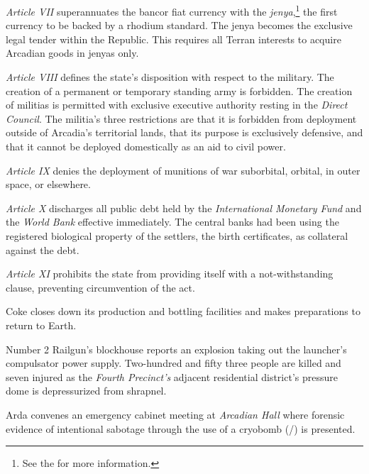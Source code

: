 \item {\it Article VII} superannuates the bancor fiat currency with the {\it jenya},\footnote{See the \about[Jenya] for more information.} the first currency to be backed by a rhodium standard. The jenya becomes the exclusive legal tender within the Republic. This requires all Terran interests to acquire Arcadian goods in jenyas only.

\item {\it Article VIII} defines the state's disposition with respect to the military. The creation of a permanent or temporary standing army is forbidden. The creation of militias is permitted with exclusive executive authority resting in the {\it Direct Council}. The militia's three restrictions are that it is forbidden from deployment outside of Arcadia's territorial lands, that its purpose is exclusively defensive, and that it cannot be deployed domestically as an aid to civil power.

\item {\it Article IX} denies the deployment of munitions of war suborbital, orbital, in outer space, or elsewhere.

\item {\it Article X} discharges all public debt held by the {\it International Monetary Fund} and the {\it World Bank} effective immediately. The central banks had been using the registered biological property of the settlers, the birth certificates, as collateral against the debt.

\item {\it Article XI} prohibits the state from providing itself with a not-withstanding clause, preventing circumvention of the act.
\stopitemize
\stopTimelineDocument
\StopTimelineDate

Coke closes down its production and bottling facilities and makes preparations to return to Earth.
\StopTimelineDate

Number 2 Railgun's blockhouse reports an explosion taking out the launcher's compulsator power supply. Two-hundred and fifty three people are killed and seven injured as the {\it Fourth Precinct's} adjacent residential district's pressure dome is depressurized from shrapnel.

Arda convenes an emergency cabinet meeting at {\it Arcadian Hall} where forensic evidence of intentional sabotage through the use of a cryobomb (/) is presented.
\StopTimelineDate

